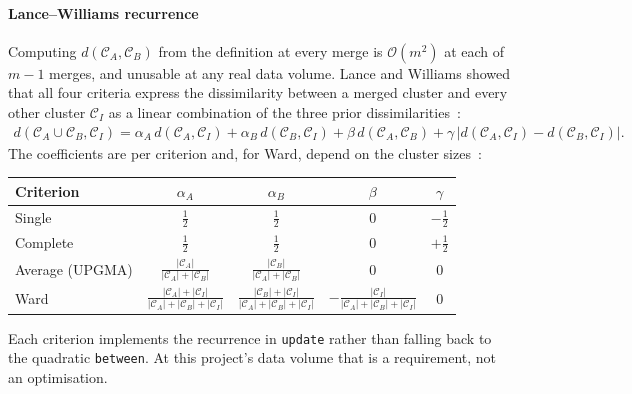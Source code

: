 \paragraph{Lance--Williams recurrence}
\label{sec:tech:linkage:recurrence}
Computing $d(\mathcal C_A, \mathcal C_B)$ from the definition at every
merge is $\mathcal O(m^2)$ at each of $m - 1$ merges, and unusable at any
real data volume. Lance and Williams showed that all four criteria
express the dissimilarity between a merged cluster and every other
cluster $\mathcal C_I$ as a linear combination of the three prior
dissimilarities~\cite{ref_29}:
\begin{align}
    d(\mathcal C_A \cup \mathcal C_B, \mathcal C_I)
    = \alpha_A \, d(\mathcal C_A, \mathcal C_I)
    + \alpha_B \, d(\mathcal C_B, \mathcal C_I)
    + \beta   \, d(\mathcal C_A, \mathcal C_B)
    + \gamma  \, \left| d(\mathcal C_A, \mathcal C_I) - d(\mathcal C_B, \mathcal C_I) \right|.
\end{align}
The coefficients are per criterion and, for Ward, depend on the cluster
sizes~\cite{ref_10}:
\begin{center}
\begin{tabular}{lcccc}
\toprule
Criterion & $\alpha_A$ & $\alpha_B$ & $\beta$ & $\gamma$ \\
\midrule
Single   & $\tfrac{1}{2}$ & $\tfrac{1}{2}$ & $0$ & $-\tfrac{1}{2}$ \\
Complete & $\tfrac{1}{2}$ & $\tfrac{1}{2}$ & $0$ & $+\tfrac{1}{2}$ \\
Average (UPGMA) & $\tfrac{|\mathcal C_A|}{|\mathcal C_A|+|\mathcal C_B|}$
                & $\tfrac{|\mathcal C_B|}{|\mathcal C_A|+|\mathcal C_B|}$
                & $0$ & $0$ \\
Ward     & $\tfrac{|\mathcal C_A|+|\mathcal C_I|}{|\mathcal C_A|+|\mathcal C_B|+|\mathcal C_I|}$
         & $\tfrac{|\mathcal C_B|+|\mathcal C_I|}{|\mathcal C_A|+|\mathcal C_B|+|\mathcal C_I|}$
         & $-\tfrac{|\mathcal C_I|}{|\mathcal C_A|+|\mathcal C_B|+|\mathcal C_I|}$
         & $0$ \\
\bottomrule
\end{tabular}
\end{center}
Each criterion implements the recurrence in \texttt{update} rather than
falling back to the quadratic \texttt{between}. At this project's data
volume that is a requirement, not an optimisation.

